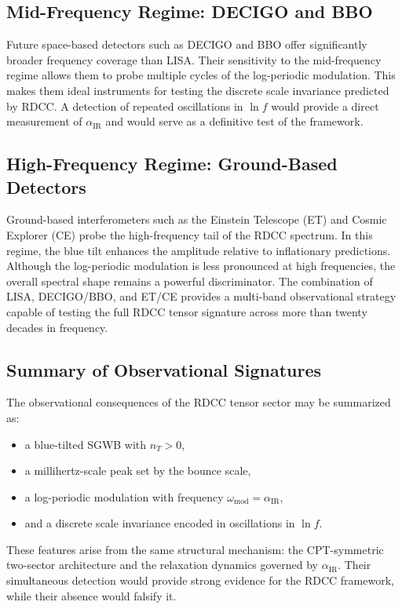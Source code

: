 \documentclass[11pt,a4paper]{article}
\begin{document}
\subsection{Mid-Frequency Regime: DECIGO and BBO}

Future space-based detectors such as DECIGO and BBO offer significantly broader
frequency coverage than LISA. Their sensitivity to the mid-frequency regime allows
them to probe multiple cycles of the log-periodic modulation. This makes them
ideal instruments for testing the discrete scale invariance predicted by RDCC.
A detection of repeated oscillations in $\ln f$ would provide a direct measurement
of $\alpha_{\mathrm{IR}}$ and would serve as a definitive test of the framework.

\subsection{High-Frequency Regime: Ground-Based Detectors}

Ground-based interferometers such as the Einstein Telescope (ET) and Cosmic
Explorer (CE) probe the high-frequency tail of the RDCC spectrum. In this regime,
the blue tilt enhances the amplitude relative to inflationary predictions. Although
the log-periodic modulation is less pronounced at high frequencies, the overall
spectral shape remains a powerful discriminator. The combination of LISA,
DECIGO/BBO, and ET/CE provides a multi-band observational strategy capable of
testing the full RDCC tensor signature across more than twenty decades in
frequency.

\subsection{Summary of Observational Signatures}

The observational consequences of the RDCC tensor sector may be summarized as:
\begin{itemize}
    \item a blue-tilted SGWB with $n_{T} > 0$,
    \item a millihertz-scale peak set by the bounce scale,
    \item a log-periodic modulation with frequency $\omega_{\mathrm{mod}} = \alpha_{\mathrm{IR}}$,
    \item and a discrete scale invariance encoded in oscillations in $\ln f$.
\end{itemize}
These features arise from the same structural mechanism: the CPT-symmetric
two-sector architecture and the relaxation dynamics governed by
$\alpha_{\mathrm{IR}}$. Their simultaneous detection would provide strong evidence
for the RDCC framework, while their absence would falsify it.
\end{document}

